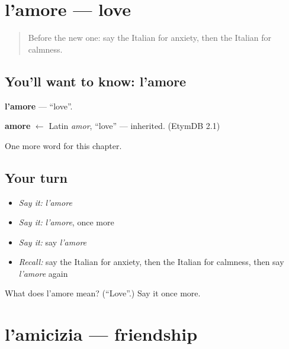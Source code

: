 \section[l'amore]{l'amore — love}

\label{lesson:IT-C186-amore}



\begin{quote}
Before the new one: say the Italian for anxiety, then the Italian for calmness.
\end{quote}

\subsection*{You'll want to know: l'amore}
\textbf{l'amore} — \textquotedblleft{}love\textquotedblright{}.

\begin{cousinweb}
\textbf{amore} $\leftarrow$ Latin \emph{amor}, \textquotedblleft{}love\textquotedblright{} — inherited. (EtymDB 2.1)
\end{cousinweb}

\begin{grammarlens}[title={What you've built}]
One more word for this chapter.
\end{grammarlens}

\subsection*{Your turn}
\begin{itemize}
\raggedright
  \item \emph{Say it:} \emph{l'amore}
  \item \emph{Say it:} \emph{l'amore}, once more
  \item \emph{Say it:} say \emph{l'amore}
  \item \emph{Recall:} say the Italian for anxiety, then the Italian for calmness, then say \emph{l'amore} again
\end{itemize}

\begin{tcolorbox}[breakable,colback=teal!4,colframe=teal!35!black,title={Before you move on}]
What does l'amore mean? (\textquotedblleft{}Love\textquotedblright{}.) Say it once more.
\end{tcolorbox}
\section[l'amicizia]{l'amicizia — friendship}

